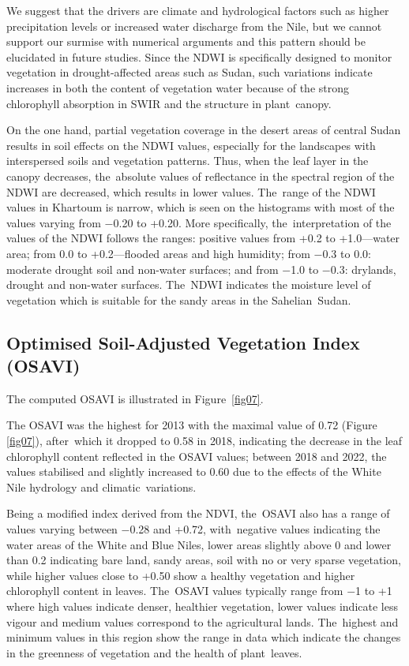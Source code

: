 \documentclass[jimaging,article,accept,pdftex,moreauthors]{Definitions/mdpi}
\begin{document}
We suggest that the drivers are climate and hydrological factors such as higher precipitation levels or increased water discharge from the Nile, but we cannot support our surmise with numerical arguments and this pattern should be elucidated in future studies. Since the NDWI is specifically designed to monitor vegetation in drought-affected areas such as Sudan, such variations indicate increases in both the content of vegetation water because of the strong chlorophyll absorption in SWIR and the structure in plant~canopy. 

On the one hand, partial vegetation coverage in the desert areas of central Sudan results in soil effects on the NDWI values, especially for the landscapes with interspersed soils and vegetation patterns. Thus, when the leaf layer in the canopy decreases, the~absolute values of reflectance in the spectral region of the NDWI are decreased, which results in lower values. The~range of the NDWI values in Khartoum is narrow, which is seen on the histograms with most of the values varying from $-$0.20 to +0.20. More specifically, the~interpretation of the values of the NDWI follows the ranges: positive values from +0.2 to +1.0---water area; from 0.0 to +0.2---flooded areas and high humidity; from $-$0.3 to 0.0: moderate drought soil and non-water surfaces; and from $-$1.0 to $-$0.3: drylands, drought and non-water surfaces. The~NDWI indicates the moisture level of vegetation which is suitable for the sandy areas in the Sahelian~Sudan.

\subsection{Optimised Soil-Adjusted Vegetation Index (OSAVI)}

The computed OSAVI is illustrated in Figure~\ref{fig07}. 


The OSAVI was the highest for 2013 with the maximal value of 0.72 (Figure \ref{fig07}), after~which it dropped to 0.58 in 2018, indicating the decrease in the leaf chlorophyll content reflected in the OSAVI values; between 2018 and 2022, the values stabilised and slightly increased to 0.60 due to the effects of the White Nile hydrology and climatic~variations. 

Being a modified index derived from the NDVI, the~OSAVI also has a range of values varying between $-$0.28 and +0.72, with~negative values indicating the water areas of the White and Blue Niles, lower areas slightly above 0 and lower than 0.2 indicating bare land, sandy areas, soil with no or very sparse vegetation, while higher values close to +0.50 show a healthy vegetation and higher chlorophyll content in leaves. The~OSAVI values typically range from $-$1 to +1 where high values indicate denser, healthier vegetation, lower values indicate less vigour and medium values correspond to the agricultural lands. The~highest and minimum values in this region show the range in data which indicate the changes in the greenness of vegetation and the health of plant~leaves.
\end{document}
